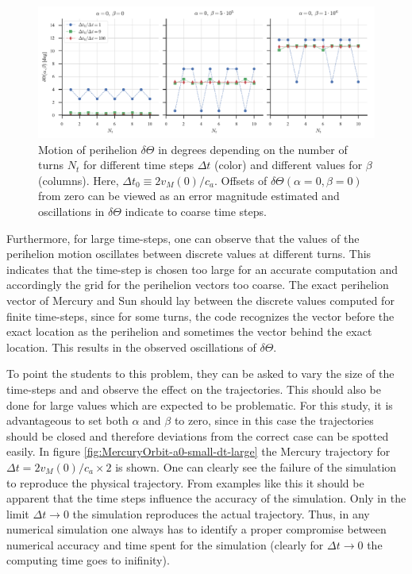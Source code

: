 \documentclass[12pt,ngerman,american]{iopart}
\begin{document}
\begin{figure}[htb]
	\centering
	\includegraphics[width=.99\textwidth]{figs/angular-variaton.pdf}
	\caption{\label{fcc3}Motion of perihelion $\delta\Theta$ in degrees depending on the number of turns $N_t$ for different time steps $\Delta t$ (color) and different values for $\beta$ (columns).
	Here, $\Delta t_0 \equiv 2 v_M(0)/c_a$.
	Offsets of $\delta \Theta(\alpha=0, \beta=0)$ from zero can be viewed as an error magnitude estimated and oscillations in $\delta \Theta$ indicate to coarse time steps.
}
\end{figure}

Furthermore, for large time-steps, one can observe that the values of the perihelion motion oscillates between discrete values at different turns.
This indicates that the time-step is chosen too large for an accurate computation and accordingly the grid for the perihelion vectors too coarse.
The exact perihelion vector of Mercury and  Sun should lay between the discrete values computed for finite time-steps, since for
some turns, the code recognizes the vector before the exact location as the perihelion and sometimes the vector behind the exact location.
This results in the observed oscillations of $\delta \Theta$.


To point the students to this problem, they can be asked to vary the size of the time-steps and and observe the effect on the trajectories.
This should also be done for large values which are expected to be problematic.
For this study, it is advantageous to set both $\alpha$ and $\beta$ to zero,
since in this case the trajectories should be closed and therefore deviations from the correct case can be spotted easily.
In figure \ref{fig:MercuryOrbit-a0-small-dt-large} the Mercury trajectory for $\Delta t=2 v_M(0) / c_a \times 2$ is shown.
One can clearly see the failure of the simulation to reproduce the physical trajectory.
From examples like this it should be apparent that the time steps influence the accuracy of the simulation.
Only in the limit $\Delta t \rightarrow 0$ the simulation reproduces the actual trajectory. Thus, in any numerical simulation
one always has to identify a proper compromise between numerical accuracy and time spent for the simulation
(clearly for $\Delta t\to 0$ the computing time goes to inifinity).
\end{document}
